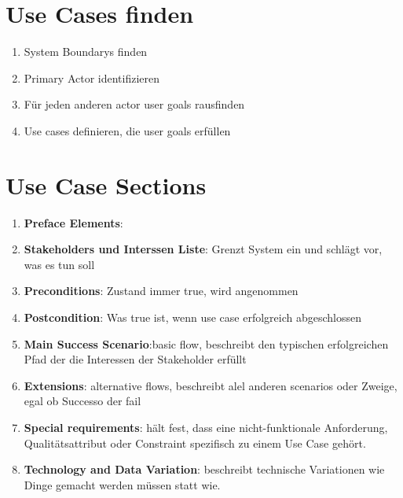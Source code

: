 \section{Use Cases finden}
\begin{enumerate}
    \item System Boundarys finden
    \item Primary Actor identifizieren
    \item Für jeden anderen actor user goals rausfinden
    \item Use cases definieren, die user goals erfüllen
\end{enumerate}

\section{Use Case Sections}
\begin{enumerate}
    \item \textbf{Preface Elements}:
    \item \textbf{Stakeholders und Interssen Liste}: Grenzt System ein und
    schlägt vor, was es tun soll
    \item \textbf{Preconditions}: Zustand immer true, wird angenommen
    \item \textbf{Postcondition}: Was true ist, wenn use case erfolgreich
    abgeschlossen
    \item \textbf{Main Success Scenario}:basic flow, beschreibt den typischen
    erfolgreichen Pfad der die Interessen der Stakeholder erfüllt
    \item \textbf{Extensions}: alternative flows, beschreibt alel anderen scenarios
    oder Zweige, egal ob Successo der fail
    \item \textbf{Special requirements}: hält fest, dass eine nicht-funktionale
    Anforderung, Qualitätsattribut oder Constraint spezifisch zu einem Use Case
    gehört.
    \item \textbf{Technology and Data Variation}: beschreibt technische Variationen
    wie Dinge gemacht werden müssen statt wie.
\end{enumerate}
